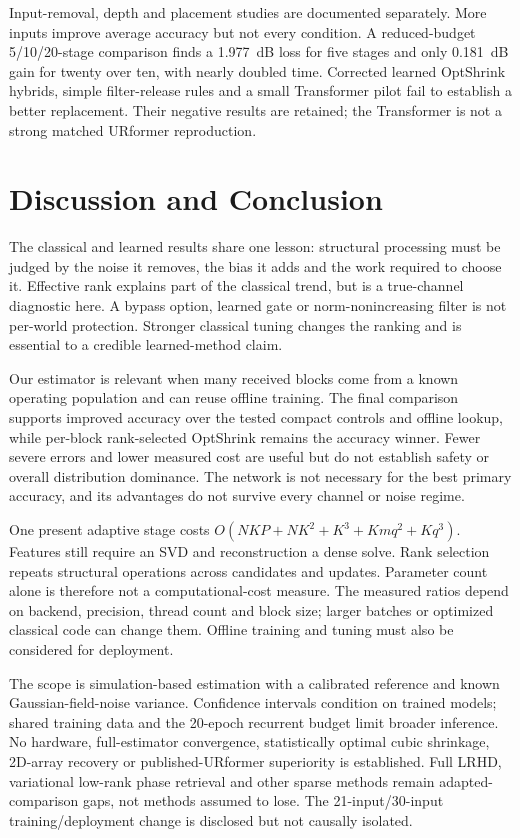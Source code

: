 \documentclass[10pt,journal,letterpaper]{IEEEtran}
\begin{document}
Input-removal, depth and placement studies are documented separately. More inputs improve average accuracy but not every condition. A reduced-budget 5/10/20-stage comparison finds a 1.977~dB loss for five stages and only 0.181~dB gain for twenty over ten, with nearly doubled time. Corrected learned OptShrink hybrids, simple filter-release rules and a small Transformer pilot fail to establish a better replacement. Their negative results are retained; the Transformer is not a strong matched URformer reproduction.

\section{Discussion and Conclusion}
The classical and learned results share one lesson: structural processing must be judged by the noise it removes, the bias it adds and the work required to choose it. Effective rank explains part of the classical trend, but is a true-channel diagnostic here. A bypass option, learned gate or norm-nonincreasing filter is not per-world protection. Stronger classical tuning changes the ranking and is essential to a credible learned-method claim.

Our estimator is relevant when many received blocks come from a known operating population and can reuse offline training. The final comparison supports improved accuracy over the tested compact controls and offline lookup, while per-block rank-selected OptShrink remains the accuracy winner. Fewer severe errors and lower measured cost are useful but do not establish safety or overall distribution dominance. The network is not necessary for the best primary accuracy, and its advantages do not survive every channel or noise regime.

One present adaptive stage costs $O(NKP+NK^2+K^3+Kmq^2+Kq^3)$. Features still require an SVD and reconstruction a dense solve. Rank selection repeats structural operations across candidates and updates. Parameter count alone is therefore not a computational-cost measure. The measured ratios depend on backend, precision, thread count and block size; larger batches or optimized classical code can change them. Offline training and tuning must also be considered for deployment.

The scope is simulation-based estimation with a calibrated reference and known Gaussian-field-noise variance. Confidence intervals condition on trained models; shared training data and the 20-epoch recurrent budget limit broader inference. No hardware, full-estimator convergence, statistically optimal cubic shrinkage, 2D-array recovery or published-URformer superiority is established. Full LRHD, variational low-rank phase retrieval and other sparse methods remain adapted-comparison gaps, not methods assumed to lose. The 21-input/30-input training/deployment change is disclosed but not causally isolated.
\end{document}

